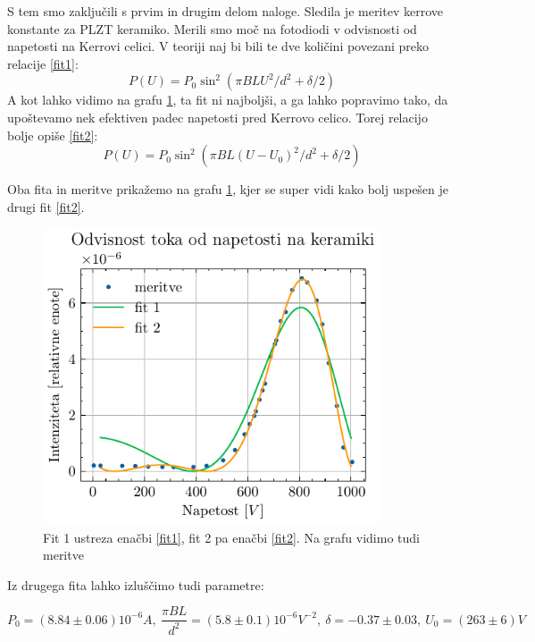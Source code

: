 \documentclass[12pt]{article}
\begin{document}
S tem smo zaključili s prvim in drugim delom naloge. Sledila je meritev kerrove konstante za PLZT keramiko. Merili smo moč na fotodiodi v odvisnosti od napetosti na Kerrovi celici. V teoriji naj bi bili te dve količini povezani preko relacije \ref{fit1}:
\begin{equation}
    P(U) = P_0 \sin^2\left(\pi B L U^2/d^2 + \delta/2\right)
    \label{fit1}
\end{equation}
A kot lahko vidimo na grafu \ref{kerr}, ta fit ni najboljši, a ga lahko popravimo tako, da upoštevamo nek efektiven padec napetosti pred Kerrovo celico. Torej relacijo bolje opiše \ref{fit2}:
\begin{equation}
    P(U) = P_0 \sin^2\left(\pi B L (U-U_0)^2/d^2 + \delta/2\right)
    \label{fit2}
\end{equation}

\noindent Oba fita in meritve prikažemo na grafu \ref{kerr}, kjer se super vidi kako bolj uspešen je drugi fit \ref{fit2}.

\begin{figure}[ht]
\begin{center}
    \includegraphics[width=10cm]{kerr.pdf}
    \caption{Fit 1 ustreza enačbi \ref{fit1}, fit 2 pa enačbi \ref{fit2}. Na grafu vidimo tudi meritve}
    \label{kerr}
\end{center}
\end{figure}

\noindent Iz drugega fita lahko izluščimo tudi parametre:

\begin{equation*}
    P_0 = (8.84\pm 0.06) 10^{-6} A,\ \frac{\pi B L}{d^2} = (5.8\pm 0.1) 10^{-6}V^{-2},\ \delta = -0.37\pm 0.03,\ U_0 = (263\pm 6) V
\end{equation*}
\end{document}

